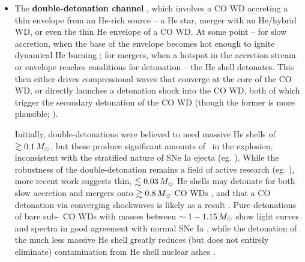 \begin{itemize}


	\item The {\bf double-detonation channel} \citep{livn90, woosw94}, which involves a CO WD accreting a thin envelope from an He-rich source -- a He star, merger with an He/hybrid WD, or even the thin He envelope of a CO WD.  At some point -- for slow accretion, when the base of the envelope becomes hot enough to ignite dynamical He burning \citep{woosk11}; for mergers, when a hotspot in the accretion stream or envelope reaches conditions for detonation \citep{guil+10, rask+12, pakm+13} -- the He shell detonates.  This then either drives compressional waves that converge at the core of the CO WD, or directly launches a detonation shock into the CO WD, both of which trigger the secondary detonation of the CO WD (though the former is more plausible; \citealt{mollw13}).  


Initially, double-detonations were believed to need massive He shells of $\gtrsim0.1\,\Msun$, but these produce significant amounts of \Ni\ in the explosion, inconsistent with the stratified nature of SNe Ia ejecta (eg. \citealt{krom+10,woosk11}).  While the robustness of the double-detonation remains a field of active research (eg. \citealt{woosk11, holc+13, shenm14, shenb14, dan+15}), more recent work suggests thin, $\lesssim0.03\,\Msun$ He shells may detonate for both slow accretion and mergers onto $\gtrsim0.8\,\Msun$ CO WDs \citep{woosk11, pakm+13, shenm14}, and that a CO detonation via converging shockwaves is likely as a result \citep{fink+10, mollw13, shenb14}.  Pure detonations of bare sub-\Mch\ CO WDs with masses between $\sim1-1.15\,\Msun$ show light curves and spectra in good agreement with normal SNe Ia \citep{shig+92, sim+10}, while the detonation of the much less massive He shell greatly reduces (but does not entirely eliminate) contamination from He shell nuclear ashes \citep{krom+10, hill+13}.



\end{itemize}
